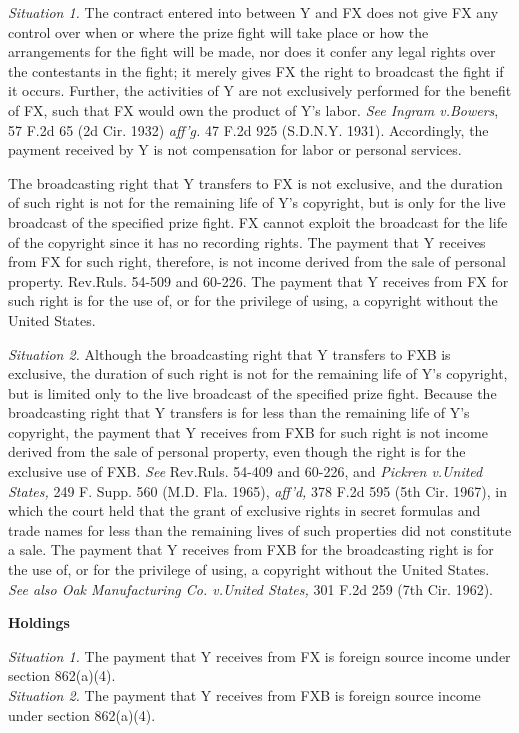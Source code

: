 \begin{select}
\textit{Situation 1.} The contract entered into between Y and FX does not give FX any control over when or where the prize
fight will take place or how the arrangements for the fight will be made, nor does it confer any legal rights over the
contestants in the fight; it merely gives FX the right to broadcast the fight if it occurs. Further, the activities of Y are not exclusively performed for the benefit of FX, such that FX would own the product of Y's labor. \textit{See Ingram v.\@ Bowers}, 57 F.2d 65 (2d Cir. 1932) \textit{aff'g.} 47 F.2d 925 (S.D.N.Y. 1931). Accordingly, the payment received by Y is not compensation for labor or personal services.

The broadcasting right that Y transfers to FX is not exclusive, and the duration of such right is not for the
remaining life of Y's copyright, but is only for the live broadcast of the specified prize fight. FX cannot exploit the
broadcast for the life of the copyright since it has no recording rights. The payment that Y receives from FX for such
right, therefore, is not income derived from the sale of personal property. Rev.\@\@ Ruls. 54-509 and 60-226. The payment
that Y receives from FX for such right is for the use of, or for the privilege of using, a copyright without the United States.

\textit{Situation 2.} Although the broadcasting right that Y transfers to FXB is exclusive, the duration of such right is not for the remaining life of Y's copyright, but is limited only to the live broadcast of the specified prize fight. Because the broadcasting right that Y transfers is for less than the remaining life of Y's copyright, the payment that Y receives from FXB for such right is not income derived from the sale of personal property, even though the right is for the exclusive use of FXB. \textit{See} Rev.\@\@ Ruls. 54-409 and 60-226, and \textit{Pickren v.\@ United States,} 249 F. Supp. 560 (M.D. Fla. 1965), \textit{aff'd,} 378 F.2d 595 (5th Cir. 1967), in which the court held that the grant of exclusive rights in secret formulas and trade names for less than the remaining lives of such properties did not constitute a sale. The payment that Y receives from FXB for the broadcasting right is for the use of, or for the privilege of using, a copyright without the United States. \textit{See also Oak Manufacturing Co. v.\@ United States,} 301 F.2d 259 (7th Cir. 1962).

\begin{center} \textbf{Holdings}
\end{center}
\textit{Situation 1.} The payment that Y receives from FX is foreign source income under section 862(a)(4).\\
\textit{Situation 2.} The payment that Y receives from FXB is foreign source income under section 862(a)(4).
\end{select}

